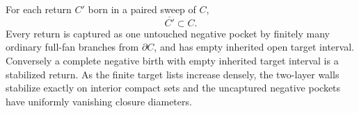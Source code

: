 \begin{proposition}\label{wall:returns}
For each return $C'$ born in a paired sweep of $C$,
\begin{equation}\label{wall:return-compact}
\overline{C'}\subset C.
\end{equation}
Every return is captured as one untouched negative pocket by finitely many ordinary full-fan branches from $\partial C$, and has empty inherited open target interval.  Conversely a complete negative birth with empty inherited target interval is a stabilized return.  As the finite target lists increase densely, the two-layer walls stabilize exactly on interior compact sets and the uncaptured negative pockets have uniformly vanishing closure diameters.
\end{proposition}


